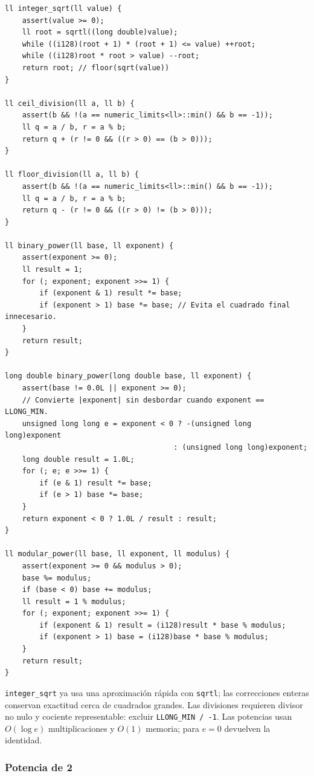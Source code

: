 \begin{lstlisting}[style=cpp]
ll integer_sqrt(ll value) {
    assert(value >= 0);
    ll root = sqrtl((long double)value);
    while ((i128)(root + 1) * (root + 1) <= value) ++root;
    while ((i128)root * root > value) --root;
    return root; // floor(sqrt(value))
}

ll ceil_division(ll a, ll b) {
    assert(b && !(a == numeric_limits<ll>::min() && b == -1));
    ll q = a / b, r = a % b;
    return q + (r != 0 && ((r > 0) == (b > 0)));
}

ll floor_division(ll a, ll b) {
    assert(b && !(a == numeric_limits<ll>::min() && b == -1));
    ll q = a / b, r = a % b;
    return q - (r != 0 && ((r > 0) != (b > 0)));
}

ll binary_power(ll base, ll exponent) {
    assert(exponent >= 0);
    ll result = 1;
    for (; exponent; exponent >>= 1) {
        if (exponent & 1) result *= base;
        if (exponent > 1) base *= base; // Evita el cuadrado final innecesario.
    }
    return result;
}

long double binary_power(long double base, ll exponent) {
    assert(base != 0.0L || exponent >= 0);
    // Convierte |exponent| sin desbordar cuando exponent == LLONG_MIN.
    unsigned long long e = exponent < 0 ? -(unsigned long long)exponent
                                       : (unsigned long long)exponent;
    long double result = 1.0L;
    for (; e; e >>= 1) {
        if (e & 1) result *= base;
        if (e > 1) base *= base;
    }
    return exponent < 0 ? 1.0L / result : result;
}

ll modular_power(ll base, ll exponent, ll modulus) {
    assert(exponent >= 0 && modulus > 0);
    base %= modulus;
    if (base < 0) base += modulus;
    ll result = 1 % modulus;
    for (; exponent; exponent >>= 1) {
        if (exponent & 1) result = (i128)result * base % modulus;
        if (exponent > 1) base = (i128)base * base % modulus;
    }
    return result;
}
\end{lstlisting}

\texttt{integer\_sqrt} ya usa una aproximaci\'on r\'apida con \texttt{sqrtl};
las correcciones enteras conservan exactitud cerca de cuadrados grandes.
Las divisiones requieren divisor no nulo y cociente representable: excluir
\texttt{LLONG\_MIN / -1}. Las potencias usan $O(\log e)$ multiplicaciones
y $O(1)$ memoria; para $e=0$ devuelven la identidad.

\subsubsection{Potencia de 2}

